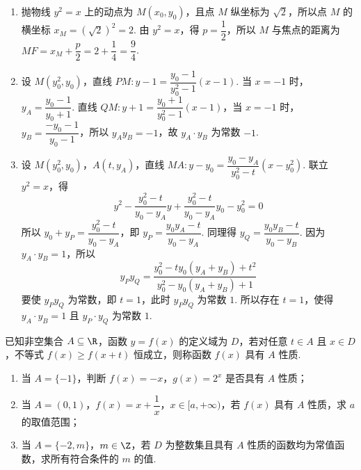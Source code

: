 \begin{solution}
\begin{enumerate}
\item 抛物线 \(y^2=x\) 上的动点为 \(M(x_0,y_0)\)，且点 \(M\) 纵坐标为 \(\sqrt{2}\)，所以点 \(M\) 的横坐标 \(x_M=(\sqrt{2})^2=2\). 由 \(y^2=x\)，得 \(p=\dfrac{1}{2}\)，所以 \(M\) 与焦点的距离为 \(MF=x_M+\dfrac{p}{2}=2+\dfrac{1}{4}=\dfrac{9}{4}\).
\item 设 \(M(y_0^2,y_0)\)，直线 \(PM\colon y-1=\dfrac{y_0-1}{y_0^2-1}(x-1)\). 当 \(x=-1\) 时，\(y_A=\dfrac{y_0-1}{y_0+1}\). 直线 \(QM\colon y+1=\dfrac{y_0+1}{y_0^2-1}(x-1)\)，当 \(x=-1\) 时，\(y_B=\dfrac{-y_0-1}{y_0-1}\)，所以 \(y_Ay_B=-1\)，故 \(y_A\cdot y_B\) 为常数 \(-1\).
\item 设 \(M(y_0^2,y_0)\)，\(A(t,y_A)\)，直线 \(MA\colon y-y_0=\dfrac{y_0-y_A}{y_0^2-t}(x-y_0^2)\). 联立 \(y^2=x\)，得
\[
y^2-\dfrac{y_0^2-t}{y_0-y_A}y+\dfrac{y_0^2-t}{y_0-y_A}y_0-y_0^2=0
\]
所以 \(y_0+y_P=\dfrac{y_0^2-t}{y_0-y_A}\)，即 \(y_P=\dfrac{y_0y_A-t}{y_0-y_A}\). 同理得 \(y_Q=\dfrac{y_0y_B-t}{y_0-y_B}\). 因为 \(y_A\cdot y_B=1\)，所以
\[
y_Py_Q=\dfrac{y_0^2-ty_0(y_A+y_B)+t^2}{y_0^2-y_0(y_A+y_B)+1}
\]
要使 \(y_Py_Q\) 为常数，即 \(t=1\)，此时 \(y_Py_Q\) 为常数 \(1\). 所以存在 \(t=1\)，使得 \(y_A\cdot y_B=1\) 且 \(y_P\cdot y_Q\) 为常数 \(1\).
\end{enumerate}
\end{solution}

\begin{problem}
已知非空集合 \(A\subseteq\R\)，函数 \(y=f(x)\) 的定义域为 \(D\)，若对任意 \(t\in A\) 且 \(x\in D\)，不等式 \(f(x)\geq f(x+t)\) 恒成立，则称函数 \(f(x)\) 具有 \(A\) 性质.
\begin{enumerate}
\item 当 \(A=\{-1\}\)，判断 \(f(x)=-x\)，\(g(x)=2^x\) 是否具有 \(A\) 性质；
\item 当 \(A=(0,1)\)，\(f(x)=x+\dfrac{1}{x}\)，\(x\in[a,+\infty)\)，若 \(f(x)\) 具有 \(A\) 性质，求 \(a\) 的取值范围；
\item 当 \(A=\{-2,m\}\)，\(m\in\Z\)，若 \(D\) 为整数集且具有 \(A\) 性质的函数均为常值函数，求所有符合条件的 \(m\) 的值.
\end{enumerate}
\end{problem}

